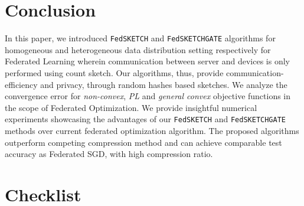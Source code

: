 \documentclass[11pt]{article}
\begin{document}
\vspace{-0.1in}
\section{Conclusion}
\vspace{-0.05in}

In this paper, we introduced \texttt{FedSKETCH} and \texttt{FedSKETCHGATE} algorithms for homogeneous and heterogeneous data distribution setting respectively for Federated Learning wherein communication between server and devices is only performed using count sketch. 
Our algorithms, thus, provide communication-efficiency and privacy, through random hashes based sketches. 
We analyze the convergence error for \emph{non-convex}, \emph{PL} and \emph{general convex} objective functions in the scope of Federated Optimization.  
We provide insightful numerical experiments showcasing the advantages of our \texttt{FedSKETCH} and \texttt{FedSKETCHGATE} methods over current federated optimization algorithm. The proposed algorithms outperform competing compression method and can achieve comparable test accuracy as Federated SGD, with high compression ratio.






\clearpage



\clearpage

\section*{Checklist}
\end{document}
